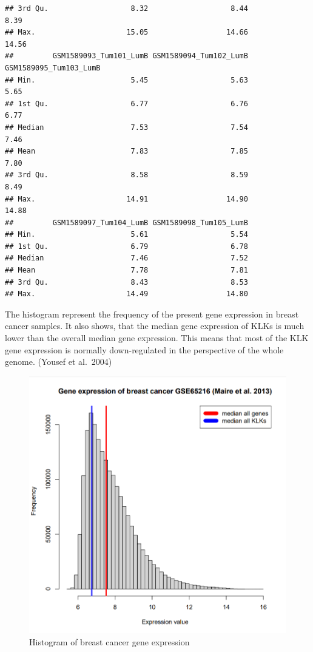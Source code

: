 \documentclass[
]{article}
\begin{document}
\begin{verbatim}
## 3rd Qu.                   8.32                   8.44                   8.39
## Max.                     15.05                  14.66                  14.56
##         GSM1589093_Tum101_LumB GSM1589094_Tum102_LumB GSM1589095_Tum103_LumB
## Min.                      5.45                   5.63                   5.65
## 1st Qu.                   6.77                   6.76                   6.77
## Median                    7.53                   7.54                   7.46
## Mean                      7.83                   7.85                   7.80
## 3rd Qu.                   8.58                   8.59                   8.49
## Max.                     14.91                  14.90                  14.88
##         GSM1589097_Tum104_LumB GSM1589098_Tum105_LumB
## Min.                      5.61                   5.54
## 1st Qu.                   6.79                   6.78
## Median                    7.46                   7.52
## Mean                      7.78                   7.81
## 3rd Qu.                   8.43                   8.53
## Max.                     14.49                  14.80
\end{verbatim}

The histogram represent the frequency of the present gene expression in
breast cancer samples. It also shows, that the median gene expression of
KLKs is much lower than the overall median gene expression. This means
that most of the KLK gene expression is normally down-regulated in the
perspective of the whole genome. (Yousef et al.~2004)

\begin{figure}

{\centering \includegraphics[width=0.5\linewidth]{images/Histogram_breast} 

}

\caption{Histogram of breast cancer gene expression}\label{fig:Histogram - breast }
\end{figure}
\end{document}

